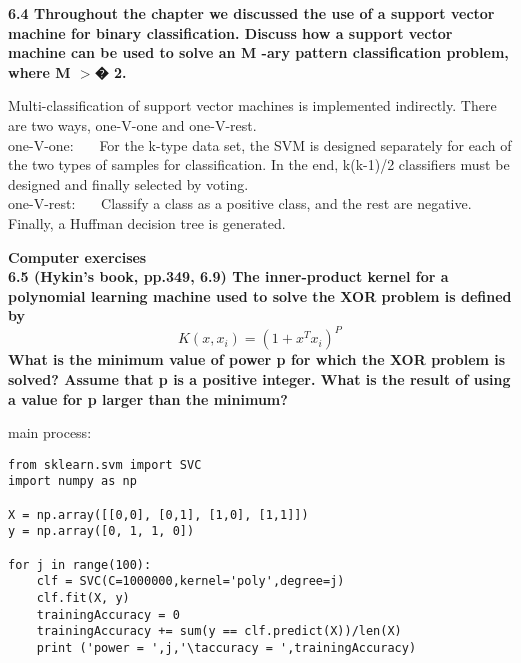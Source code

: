 \noindent \textbf{6.4 Throughout the chapter we discussed the use of a support vector machine for binary classification.
Discuss how a support vector machine can be used to solve an M -ary pattern classification problem,
where M $>$� 2.}

\noindent Multi-classification of support vector machines is implemented indirectly. There are two ways, one-V-one and one-V-rest.\\
one-V-one:~~~
For the k-type data set, the SVM is designed separately for each of the two types of samples for classification. In the end, k(k-1)/2 classifiers must be designed and finally selected by voting.\\
one-V-rest:~~~
Classify a class as a positive class, and the rest are negative. Finally, a Huffman decision tree is generated.

\newpage
\noindent \textbf{Computer exercises\\
6.5 (Hykin’s book, pp.349, 6.9) The inner-product kernel for a polynomial learning machine used to
solve the XOR problem is defined by
$$K(x,x_i)=(1+x^Tx_i)^P$$
What is the minimum value of power p for which the XOR problem is solved? Assume that p is a
positive integer. What is the result of using a value for p larger than the minimum?}

\noindent main process:
\begin{lstlisting}
from sklearn.svm import SVC
import numpy as np

X = np.array([[0,0], [0,1], [1,0], [1,1]])
y = np.array([0, 1, 1, 0])

for j in range(100):
    clf = SVC(C=1000000,kernel='poly',degree=j)
    clf.fit(X, y)
    trainingAccuracy = 0
    trainingAccuracy += sum(y == clf.predict(X))/len(X)
    print ('power = ',j,'\taccuracy = ',trainingAccuracy)
\end{lstlisting}

